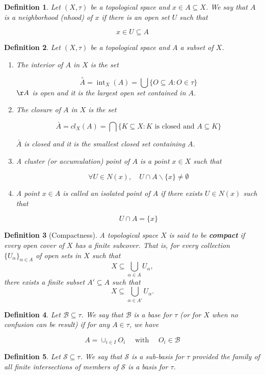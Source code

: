 \documentclass{article}
\newtheorem{definition}{Definition}[subsection]
\theoremstyle{definition}
\begin{document}
\begin{definition}
     Let $(X, \tau)$ be a topological space and $x \in A \subseteq X$. We say that $A$ is a neighborhood (nhood) of $x$ if there is an open set $U$ such that

$$
x \in U \subseteq A
$$
\end{definition}
\begin{definition}
    Let $(X, \tau)$ be a topological space and $A$ a subset of $X$.
    \begin{enumerate}
        \item The interior of $A$ in $X$ is the set

$$
\stackrel{\circ}{A}=\operatorname{int}_{X}(A)=\bigcup\{O \subseteq A: O \in \tau\}
$$
        $\AA$ is open and it is the largest open set contained in $A$.

        \item The closure of $A$ in $X$ is the set


\begin{equation*}
\bar{A}=c l_{X}(A)=\bigcap\{K \subseteq X: K \text { is closed and } A \subseteq K\} 
\end{equation*}


$\bar{A}$ is closed and it is the smallest closed set containing $A$.
    \item  A cluster (or accumulation) point of $A$ is a point $x \in X$ such that

$$
\forall U \in N(x), \quad U \cap A \backslash\{x\} \neq \emptyset
$$
    \item A point $x \in A$ is called an isolated point of $A$ if there exists $U \in N(x)$ such that

$$
U \cap A=\{x\}
$$

    \end{enumerate}
\end{definition}

\begin{definition}[Compactness]
A topological space $X$ is said to be \textbf{compact} if every open cover of $X$ has a finite subcover. That is, for every collection $\{U_\alpha\}_{\alpha \in A}$ of open sets in $X$ such that
\[ X \subseteq \bigcup_{\alpha \in A} U_\alpha, \]
there exists a finite subset $A' \subseteq A$ such that
\[ X \subseteq \bigcup_{\alpha \in A'} U_\alpha. \]
\end{definition}


\begin{definition}
    Let $\mathcal{B} \subseteq \tau$. We say that $\mathcal{B}$ is a base for $\tau$ (or for $X$ when no confusion can be result) if for any $A \in \tau$, we have

$$
A=\cup_{i \in I} O_{i} \quad \text { with } \quad O_{i} \in \mathcal{B}
$$
\end{definition}
\begin{definition}
     Let $\mathcal{S} \subseteq \tau$. We say that $\mathcal{S}$ is a sub-basis for $\tau$ provided the family of all finite intersections of members of $\mathcal{S}$ is a basis for $\tau$.
\end{definition}
\end{document}

